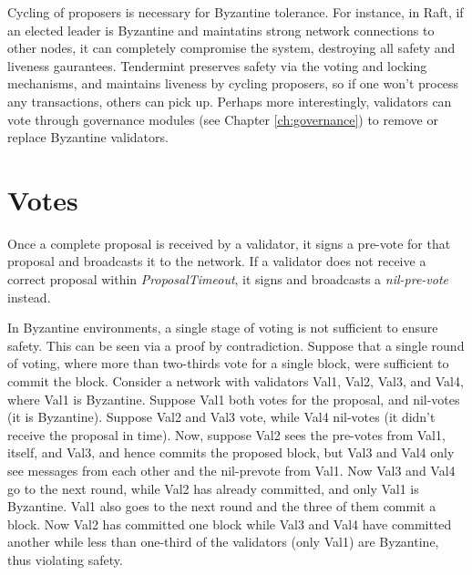 Cycling of proposers is necessary for Byzantine tolerance. 
For instance, in Raft, if an elected leader is Byzantine and maintatins strong network connections to other nodes,
it can completely compromise the system, destroying all safety and liveness gaurantees.
Tendermint preserves safety via the voting and locking mechanisms, 
and maintains liveness by cycling proposers, so if one won't process any transactions, others can pick up.
Perhaps more interestingly, validators can vote through governance modules (see Chapter \ref{ch:governance}) to remove or replace Byzantine validators.

\iffalse
TODO: move the tuning comment 
Upon entering a new round, validators wait ProposalTimeout to receive a complete proposal before broadcasting their pre-vote.
The ProposalTimeout thus serves as a critical paramter for tuning the performance of the system,
as it determines how much latency is permitted from proposers before validators start voting to skip them.
\fi

\section{Votes}

Once a complete proposal is received by a validator, 
it signs a pre-vote for that proposal and broadcasts it to the network.
If a validator does not receive a correct proposal within \emph{ProposalTimeout}, 
it signs and broadcasts a \emph{nil-pre-vote} instead.

In Byzantine environments, a single stage of voting is not sufficient to ensure safety.
This can be seen via a proof by contradiction.
Suppose that a single round of voting, where more than two-thirds vote for a single block, were sufficient to commit the block.
Consider a network with validators Val1, Val2, Val3, and Val4, where Val1 is Byzantine.
Suppose Val1 both votes for the proposal, and nil-votes (it is Byzantine).
Suppose Val2 and Val3 vote, while Val4 nil-votes (it didn't receive the proposal in time).
Now, suppose Val2 sees the pre-votes from Val1, itself, and Val3, and hence commits the proposed block,
but Val3 and Val4 only see messages from each other and the nil-prevote from Val1.
Now Val3 and Val4 go to the next round, while Val2 has already committed, and only Val1 is Byzantine.
Val1 also goes to the next round and the three of them commit a block.
Now Val2 has committed one block while Val3 and Val4 have committed another while less than one-third of the validators (only Val1) are Byzantine,
thus violating safety. 

